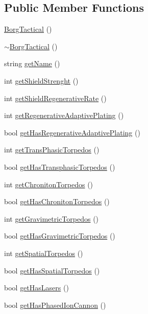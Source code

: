 \subsection*{Public Member Functions}
\begin{DoxyCompactItemize}
\item 
\hyperlink{classBorgTactical_ac4cf305eefa102b5a09ad6f8c12276c2}{BorgTactical} ()
\item 
\hyperlink{classBorgTactical_a33dadcd0fdae2e7342f37b932ac153e2}{$\sim$BorgTactical} ()
\item 
string \hyperlink{classBorgTactical_a456907d48bdd59c8300d9087ba99e1fb}{getName} ()
\item 
int \hyperlink{classBorgTactical_add906680b27f10814a90871df6b7a5bf}{getShieldStrenght} ()
\item 
int \hyperlink{classBorgTactical_a6695595b8993d01254cbe36676ddfb5a}{getShieldRegenerativeRate} ()
\item 
int \hyperlink{classBorgTactical_a2a2943c732727f0d80c63500b5ca527c}{getRegenerativeAdaptivePlating} ()
\item 
bool \hyperlink{classBorgTactical_ade29b0b43b95245653b98f2c0404e782}{getHasRegenerativeAdaptivePlating} ()
\item 
int \hyperlink{classBorgTactical_aa1b3f168acdd21317a4722a29f141bbd}{getTransPhasicTorpedos} ()
\item 
bool \hyperlink{classBorgTactical_a6e551bf387d323403ec3101a97f69501}{getHasTransphasicTorpedos} ()
\item 
int \hyperlink{classBorgTactical_a7ec4b30da34f8218af05f3b6f8edae7a}{getChronitonTorpedos} ()
\item 
bool \hyperlink{classBorgTactical_a8935e0a04c713ffe97bd2174cd07e378}{getHasChronitonTorpedos} ()
\item 
int \hyperlink{classBorgTactical_a8fe417f1c8ae45dbef3c47799c53ed67}{getGravimetricTorpedos} ()
\item 
bool \hyperlink{classBorgTactical_a9d6b52ebb37608db2a10fd7f690a1103}{getHasGravimetricTorpedos} ()
\item 
int \hyperlink{classBorgTactical_a2809be98aae522a10adffabe2a118001}{getSpatialTorpedos} ()
\item 
bool \hyperlink{classBorgTactical_a3bdb9af44e6b4e0f82786ea56ffb4886}{getHasSpatialTorpedos} ()
\item 
bool \hyperlink{classBorgTactical_a8259fa23b1207cd31564bfd1e30781e5}{getHasLasers} ()
\item 
bool \hyperlink{classBorgTactical_ab8ebb12c13c99f80d20fc829298fd05e}{getHasPhasedIonCannon} ()

\end{DoxyCompactItemize}
